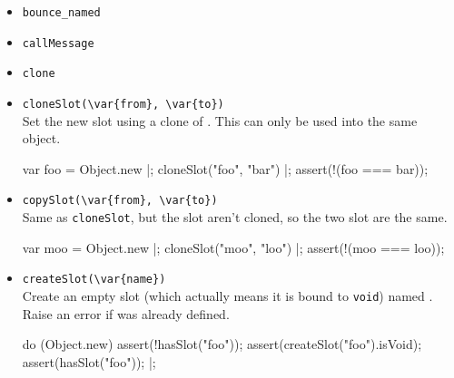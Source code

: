\begin{itemize}
\item \lstinline|bounce_named|\\

\item \lstinline|callMessage|\\

\item \lstinline|clone|\\

\item \lstinline|cloneSlot(\var{from}, \var{to})|\\
  Set the new slot  using a clone of . This can only
  be used into the same object.

\begin{urbiscript}[firstnumber=last]
var foo = Object.new |;
cloneSlot("foo", "bar") |;
assert(!(foo === bar));
\end{urbiscript}

\item \lstinline|copySlot(\var{from}, \var{to})|\\
  Same as \lstinline|cloneSlot|, but the slot aren't cloned, so the
  two slot are the same.

\begin{urbiscript}[firstnumber=last]
var moo = Object.new |;
cloneSlot("moo", "loo") |;
assert(!(moo === loo));
\end{urbiscript}

\item \lstinline|createSlot(\var{name})|\\
  Create an empty slot (which actually means it is bound to
  \lstinline|void|) named .  Raise an error if 
  was already defined.
\begin{urbiscript}[firstnumber=last]
do (Object.new)
{
  assert(!hasSlot("foo"));
  assert(createSlot("foo").isVoid);
  assert(hasSlot("foo"));
}|;
\end{urbiscript}


\end{itemize}
